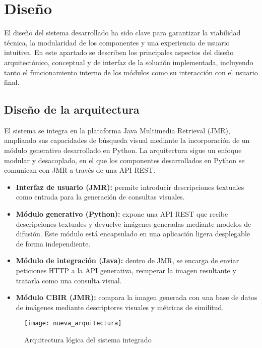 \section{Diseño}

El diseño del sistema desarrollado ha sido clave para garantizar la viabilidad técnica, la modularidad de los componentes y una experiencia de usuario intuitiva. En este apartado se describen los principales aspectos del diseño arquitectónico, conceptual y de interfaz de la solución implementada, incluyendo tanto el funcionamiento interno de los módulos como su interacción con el usuario final.

\subsection{Diseño de la arquitectura}

El sistema se integra en la plataforma Java Multimedia Retrieval (JMR), ampliando sus capacidades de búsqueda visual mediante la incorporación de un módulo generativo desarrollado en Python. La arquitectura sigue un enfoque modular y desacoplado, en el que los componentes desarrollados en Python se comunican con JMR a través de una API REST.

\begin{itemize}
    \item \textbf{Interfaz de usuario (JMR):} permite introducir descripciones textuales como entrada para la generación de consultas visuales.
    
    \item \textbf{Módulo generativo (Python):} expone una API REST que recibe descripciones textuales y devuelve imágenes generadas mediante modelos de difusión. Este módulo está encapsulado en una aplicación ligera desplegable de forma independiente.
    
    \item \textbf{Módulo de integración (Java):} dentro de JMR, se encarga de enviar peticiones HTTP a la API generativa, recuperar la imagen resultante y tratarla como una consulta visual.
    
    \item \textbf{Módulo CBIR (JMR):} compara la imagen generada con una base de datos de imágenes mediante descriptores visuales y métricas de similitud.
\end{itemize}

\begin{figure}[H]
    \centering
    \texttt{[image: nueva\_arquitectura]}
    \caption{Arquitectura lógica del sistema integrado}
    \label{fig:arquitectura-final}
\end{figure}

